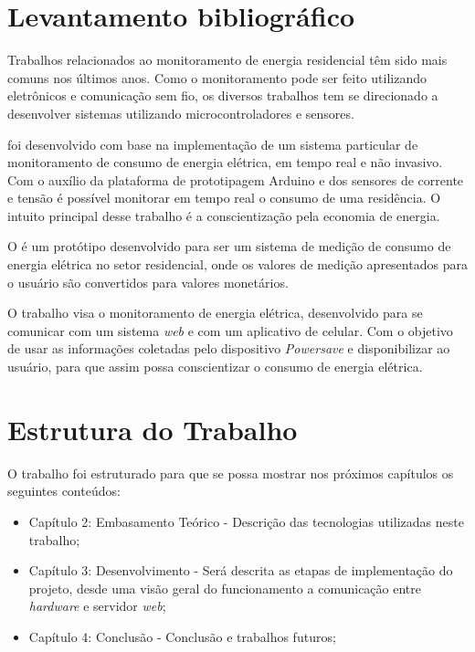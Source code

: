 \section{Levantamento bibliográfico}
Trabalhos relacionados ao monitoramento de energia residencial têm sido mais comuns nos últimos anos. Como o monitoramento pode ser feito utilizando eletrônicos e comunicação
sem fio, os diversos trabalhos tem se direcionado a desenvolver sistemas utilizando microcontroladores e sensores.


\cite{ref-jlgb} foi desenvolvido com base na implementação de um sistema particular de monitoramento de consumo de energia elétrica, em tempo real e não invasivo.
Com o auxílio da plataforma de prototipagem Arduino e dos sensores de corrente e tensão é possível monitorar em tempo real o consumo de uma residência. O intuito principal
desse trabalho é a conscientização pela economia de energia.

O \cite{ref-apc} é um protótipo desenvolvido para ser um sistema de medição de consumo de energia elétrica no setor residencial, onde os valores de medição
apresentados para o usuário são convertidos para valores monetários.


O trabalho \cite{ref-rpc} visa o monitoramento de energia elétrica, desenvolvido para se comunicar com um sistema \textit{web} e com um aplicativo de celular.
Com o objetivo de usar as informações coletadas pelo dispositivo \textit{Powersave} e disponibilizar ao usuário, para que assim possa conscientizar o consumo de energia elétrica.

\section{Estrutura do Trabalho}
O trabalho foi estruturado para que se possa mostrar nos próximos capítulos os seguintes conteúdos:
\begin{itemize}
	\item Capítulo 2: Embasamento Teórico - Descrição das tecnologias utilizadas neste trabalho;
	\item Capítulo 3: Desenvolvimento - Será descrita as etapas de implementação do projeto, desde uma visão geral do funcionamento a comunicação entre \textit{hardware} e servidor \textit{web};
	\item Capítulo 4: Conclusão - Conclusão e trabalhos futuros;
\end{itemize}